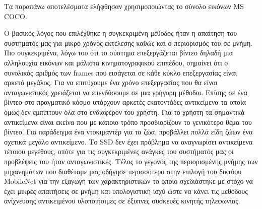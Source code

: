 Τα παραπάνω αποτελέσματα ελήφθησαν χρησιμοποιώντας το σύνολο εικόνων MS COCO.

Ο βασικός λόγος που επιλέχθηκε η συγκεκριμένη μέθοδος ήταν η απαίτηση του συστήματός μας
για μικρό χρόνος εκτέλεσης καθώς και ο περιορισμός του σε μνήμη. Πιο συγκεκριμένα,
λόγω του ότι το σύστημα επεξεργάζεται βίντεο δηλαδή μια αλληλουχία εικόνων και μάλιστα
κινηματογραφικού επιπέδου, σημαίνει ότι ο συνολικός αριθμός των frames που εισάγεται
σε κάθε κύκλο επεξεργασίας είναι αρκετά μεγάλος. Για να επιτύχουμε ένα χρόνο επεξεργασίας
που θα είναι ανταγωνιστικός χρειάζεται να επενδύσουμε σε μια γρήγορη μέθοδοι. Επίσης
σε ένα βίντεο στο πραγματικό κόσμο υπάρχουν αρκετές εκατοντάδες αντικείμενα τα οποία
όμως δεν εμπίπτουν όλα στο ενδιαφέρον του χρήστη. Για το χρήστη τα σημαντικά αντικείμενα
είναι εκείνα που με κάποιο τρόπο προσδιορίζουν το γενικότερο θέμα του βίντεο. Για παράδειγμα
ένα ντοκιμαντέρ για τα ζώα, προβάλλει πολλά είδη ζώων ένα σχετικά μεγάλο αντικείμενο. Το
SSD δεν έχει πρόβλημα να αναγνωρίσει αντικείμενα τέτοιου μεγέθους, οπότε για τις
συγκεκριμένες ανάγκες του συστήματός μας οι προβλέψεις του ήταν ανταγωνιστικές. Τέλος
το γεγονός της περιορισμένης μνήμης των μηχανημάτων που διαθέταμε μας οδήγησε περισσότερο
στην επιλογή του δικτύου MobileNet για την εξαγωγή των χαρακτηριστικών το οποίο
σχεδιάστηκε με στόχο να έχει μικρές απαιτήσεις σε μνήμη και υπολογιστική ισχύ ώστε
να κάνει τις μεθόδους ανίχνευσης αντικειμένου υλοποιήσιμες σε έξυπνες συσκευές κινητής
τηλεφωνίας.
